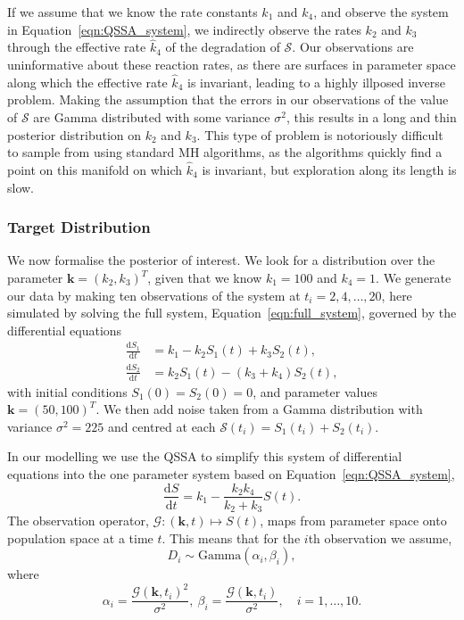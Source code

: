 \documentclass[final]{siamltex}
\begin{document}
If we assume that we know the rate constants $k_1$ and $k_4$, and
observe the system in Equation~\ref{eqn:QSSA_system}, we indirectly
observe the rates $k_2$ and $k_3$ through the effective rate
$\hat{k}_4$ of the degradation of $\mathcal{S}$. Our
observations are uninformative about these reaction rates, as there
are surfaces in parameter space along which the effective rate
$\hat{k}_4$ is invariant, leading to a highly illposed inverse
problem. Making the assumption that the errors in our observations of
the value of $\mathcal{S}$ are Gamma distributed with some variance
$\sigma^2$, this results in a long and thin posterior distribution on
$k_2$ and $k_3$. This type of problem is notoriously difficult to
sample from using standard MH algorithms, as the algorithms quickly
find a point on this manifold on which $\hat{k}_4$ is invariant, but
exploration along its length is slow.

\subsubsection{Target Distribution}

We now formalise the posterior of interest. We look for a distribution over the parameter $\mathbf{k} = (k_2, k_3)^T$, given that we know $k_1 = 100$ and $k_4=1$. We generate our data by making ten observations of the system at $t_i = 2, 4, \dots, 20$, here simulated by solving the full system, Equation~\ref{eqn:full_system}, governed by the differential equations
\begin{align*}
	\frac{\text{d}S_1}{\text{d}t} &= k_1 - k_2S_1(t)+k_3S_2(t), \\
	\frac{\text{d}S_2}{\text{d}t} &= k_2S_1(t) - (k_3+k_4)S_2(t),
\end{align*}
with initial conditions $S_1(0)=S_2(0) = 0$, and parameter values $\mathbf{k} = (50, 100)^T$. We then add noise taken from a Gamma distribution with variance $\sigma^2 = 225$ and centred at each $\mathcal{S}(t_i)=S_1(t_i)+S_2(t_i)$.

In our modelling we use the QSSA to simplify this system of differential equations into the one parameter system based on Equation~\ref{eqn:QSSA_system},
\[
	\frac{\text{d}S}{\text{d}t} = k_1 - \frac{k_2k_4}{k_2+k_3}S(t).
\]
The observation operator, $\mathcal{G}: (\mathbf{k},t) \mapsto S(t)$, maps from parameter space onto population space at a time $t$. This means that for the $i$th observation we assume,
\[
	 D_i \sim \text{Gamma}(\alpha_i, \beta_i),
\]
where
\[
	 \alpha_i = \frac{\mathcal{G}(\mathbf{k}, t_i)^2}{\sigma^2},\  \beta_i = \frac{\mathcal{G}(\mathbf{k}, t_i)}{\sigma^2}, \quad i = 1, \dots, 10.
\]
\end{document}
